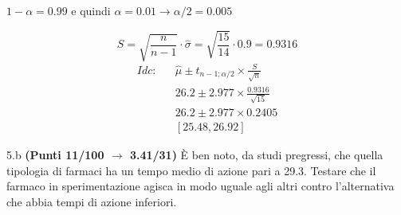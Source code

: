 \documentclass[
  11pt,
]{book}
\theoremstyle{mytheoremstyle}
\theoremstyle{mydefstyle}
\newenvironment{sol}
  {
  \begin{tcolorbox}[enhanced,breakable,arc=0.1mm,boxrule=1pt,colback=white,colframe=iblue,
  title=\bf \fontfamily{lmss}\selectfont \hspace{.5 cm} Soluzione,drop fuzzy shadow]

}{
\end{tcolorbox}
  }
\begin{document}
\begin{sol}
\(1-\alpha =0.99\) e quindi \(\alpha=0.01\rightarrow \alpha/2=0.005\)

\[
      S  =\sqrt{\frac {n}{n-1}}\cdot\hat\sigma =
     \sqrt{\frac { 15 }{ 14 }}\cdot 0.9 = 0.9316 
\]
\begin{eqnarray*}
  Idc: & &  \hat\mu \pm  t_{n-1;\alpha/2} \times \frac{S}{\sqrt{n}} \\
     & &  26.2 \pm  2.977 \times \frac{ 0.9316 }{\sqrt{ 15 }} \\
     & &  26.2 \pm  2.977 \times  0.2405 \\
     & & [ 25.48 ,  26.92 ]
\end{eqnarray*}

\end{sol}

5.b \textbf{(Punti 11/100 \(\rightarrow\) 3.41/31)} È ben noto, da studi pregressi, che quella tipologia di farmaci ha un tempo medio
di azione pari a 29.3. Testare che il farmaco in sperimentazione agisca in modo uguale agli altri contro l'alternativa che abbia tempi di azione inferiori.
\end{document}
